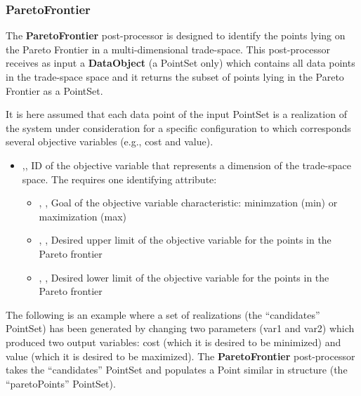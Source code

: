 
\subsubsection{ParetoFrontier}
\label{ParetoFrontierPP}
The \textbf{ParetoFrontier} post-processor is designed to identify the points lying on the Pareto Frontier in a multi-dimensional trade-space.
This post-processor receives as input a \textbf{DataObject} (a PointSet only) which contains all data points in the trade-space space and it
returns the subset of points lying in the Pareto Frontier as a PointSet.

It is here assumed that each data point of the input PointSet is a realization of the system under consideration for a
specific configuration to which corresponds several objective variables (e.g., cost and value).

%
%
\begin{itemize}
  \item   {},, ID of the objective variable that represents a dimension of the trade-space space.
          The  requires one identifying attribute:
          \begin{itemize}
            \item {}, , Goal of the objective variable characteristic: minimzation (min) or maximization (max)
            \item {}, , Desired upper limit of the objective variable for the points in the Pareto frontier
            \item {}, , Desired lower limit of the objective variable for the points in the Pareto frontier
          \end{itemize}
\end{itemize}

The following is an example where a set of realizations (the ``candidates'' PointSet) has been generated by changing two parameters
(var1 and var2) which produced two output variables: cost (which it is desired to be minimized) and value (which it is desired to be maximized).
The \textbf{ParetoFrontier} post-processor takes the ``candidates'' PointSet and populates a Point similar in structure
(the ``paretoPoints'' PointSet).


